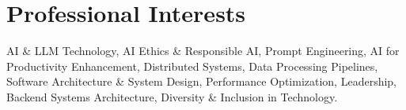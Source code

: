 
\section{Professional Interests}
\footnotesize{AI \& LLM Technology, AI Ethics \& Responsible AI, Prompt Engineering, AI for Productivity
    Enhancement, Distributed Systems, Data Processing Pipelines, Software Architecture \& System Design,
    Performance Optimization, Leadership, Backend Systems Architecture, Diversity \& Inclusion in Technology.}
